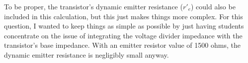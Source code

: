 To be proper, the transistor's dynamic emitter resistance ($r'_e$) could also be included in this calculation, but this just makes things more complex.  For this question, I wanted to keep things as simple as possible by just having students concentrate on the issue of integrating the voltage divider impedance with the transistor's base impedance.  With an emitter resistor value of 1500 ohms, the dynamic emitter resistance is negligibly small anyway.





